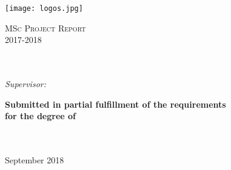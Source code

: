 \documentclass[
12pt, %
english, %
singlespacing, %
headsepline, %
table]{MastersDoctoralThesis} %
\author{Chaochen \textsc{Wang}} %
\begin{document}
\frontmatter %

\pagestyle{plain} %


\begin{titlepage}

\texttt{[image: logos.jpg]} %
\begin{center}



\vspace*{.06\textheight}
{\scshape\LARGE \bfseries \univname\par}\vspace{1.5cm} %
\textsc{\Large MSc Project Report \\ 2017-2018}\\[0.5cm] %

\HRule \\[0.4cm] %
{\Huge \bfseries \ttitle\par}\vspace{0.3cm} %
\HRule \\[1cm] %

\emph{Supervisor:} \\
\href{https://www.lshtm.ac.uk/aboutus/people/palla.luigi}{\supname} %

\vfill

\large \textbf{Submitted in partial fulfillment of the requirements\\ for the degree of \degreename}\\[0.3cm] %
\groupname\\\deptname\\[1.8cm] %

\vfill

{\large September 2018}\\[4cm] %

\vfill
\end{center}
\end{titlepage}
\end{document}
